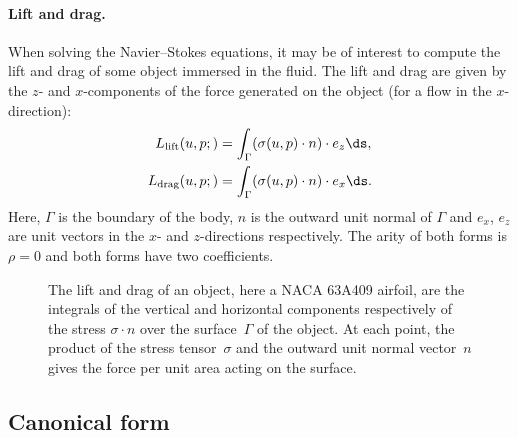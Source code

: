 \paragraph{Lift and drag.}

When solving the Navier--Stokes equations, it may be of interest to
compute the lift and drag of some object immersed in the fluid. The
lift and drag are given by the $z$- and $x$-components of the force
generated on the object (for a flow in the $x$-direction):
\begin{equation}
  \begin{split}
    L_{\mathrm{lift}}(u, p;) &= \int_{\Gamma} (\sigma(u, p) \cdot n) \cdot e_z \ds, \\
    L_{\mathrm{drag}}(u, p;) &= \int_{\Gamma} (\sigma(u, p) \cdot n) \cdot e_x \ds.
  \end{split}
\end{equation}
Here, $\Gamma$ is the boundary of the body, $n$ is the outward
unit normal of $\Gamma$ and $e_x$, $e_z$ are unit vectors
in the $x$- and $z$-directions respectively. The arity of both forms
is $\rho = 0$ and both forms have two coefficients.

\begin{figure}
\bwfig
  \centering
{}
  \caption{The lift and drag of an object, here a NACA 63A409
      airfoil, are the integrals of the vertical and horizontal
      components respectively of the stress $\sigma \cdot n$ over the
      surface~$\Gamma$ of the object. At each point, the product of
      the stress tensor~$\sigma$ and the outward unit normal
      vector~$n$ gives the force per unit area acting on the
      surface.}
\vspace*{-10pt}
\end{figure}

\enlargethispage{12pt}

\vspace*{-6pt}\subsection{Canonical form}

